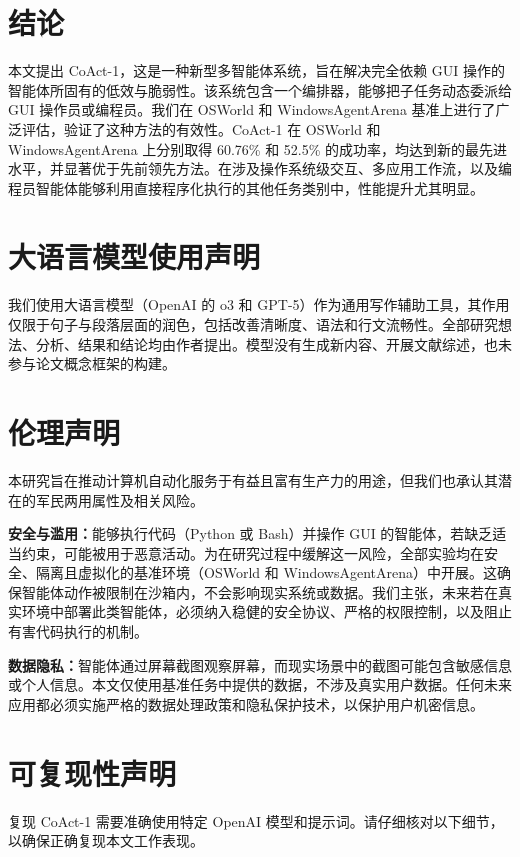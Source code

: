 \documentclass{article} %
\newcommand{\ours}{CoAct-1\xspace}
\begin{document}


\section{结论}
本文提出 \ours，这是一种新型多智能体系统，旨在解决完全依赖 GUI 操作的智能体所固有的低效与脆弱性。该系统包含一个编排器，能够把子任务动态委派给 GUI 操作员或编程员。我们在 OSWorld 和 WindowsAgentArena 基准上进行了广泛评估，验证了这种方法的有效性。\ours 在 OSWorld 和 WindowsAgentArena 上分别取得 60.76\% 和 52.5\% 的成功率，均达到新的最先进水平，并显著优于先前领先方法。在涉及操作系统级交互、多应用工作流，以及编程员智能体能够利用直接程序化执行的其他任务类别中，性能提升尤其明显。




\appendix
\section{大语言模型使用声明}
我们使用大语言模型（OpenAI 的 o3 和 GPT-5）作为通用写作辅助工具，其作用仅限于句子与段落层面的润色，包括改善清晰度、语法和行文流畅性。全部研究想法、分析、结果和结论均由作者提出。模型没有生成新内容、开展文献综述，也未参与论文概念框架的构建。

\section{伦理声明}
本研究旨在推动计算机自动化服务于有益且富有生产力的用途，但我们也承认其潜在的军民两用属性及相关风险。

\noindent\textbf{安全与滥用：}能够执行代码（Python 或 Bash）并操作 GUI 的智能体，若缺乏适当约束，可能被用于恶意活动。为在研究过程中缓解这一风险，全部实验均在安全、隔离且虚拟化的基准环境（OSWorld 和 WindowsAgentArena）中开展。这确保智能体动作被限制在沙箱内，不会影响现实系统或数据。我们主张，未来若在真实环境中部署此类智能体，必须纳入稳健的安全协议、严格的权限控制，以及阻止有害代码执行的机制。

\noindent\textbf{数据隐私：}智能体通过屏幕截图观察屏幕，而现实场景中的截图可能包含敏感信息或个人信息。本文仅使用基准任务中提供的数据，不涉及真实用户数据。任何未来应用都必须实施严格的数据处理政策和隐私保护技术，以保护用户机密信息。


\section{可复现性声明}
\label{apdx:repduction-statement}
复现 \ours 需要准确使用特定 OpenAI 模型和提示词。请仔细核对以下细节，以确保正确复现本文工作表现。
\end{document}
